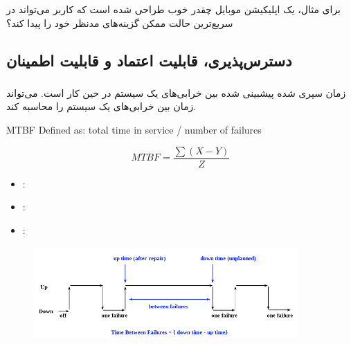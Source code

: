\documentclass[a4paper]{article}
\begin{document}
برای مثال،  یک اپلیکیشن موبایل چقدر خوب طراحی شده است که
کاربر می‌تواند در سریع‌ترین حالت ممکن گزینه‌های مدنظر خود را پیدا کند؟

\subsection{دسترس‌پذیری، قابلیت اعتماد و قابلیت اطمینان}

\subsubsection{}

زمان سپری شده پیشبینی شده بین خرابی‌های یک سیستم در حین کار است. 
می‌تواند زمان بین خرابی‌های یک سیستم را محاسبه کند.

\begin{LTR}
    MTBF Defined as: total time in service / number of failures
\end{LTR}

\begin{equation}
    MTBF = \frac{\sum(X - Y)}{Z}
\end{equation}

\begin{itemize}
    \item {}: 
    \item {}: 
    \item {}: 
\end{itemize}

\begin{figure}[H]
    \centering
    \includegraphics[width=0.9\textwidth]{images/mtbf.png}
    \caption{}
    \label{fig:MTBFDiagram}
\end{figure}

\subsubsection{}
\end{document}

